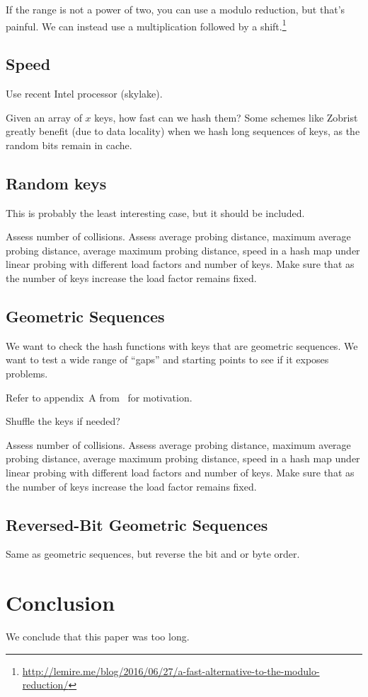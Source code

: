 \documentclass{article}
\begin{document}
If the range is not a power of two, you can use a modulo reduction, but that's painful.  We can instead use a multiplication followed by a shift.\footnote{\url{http://lemire.me/blog/2016/06/27/a-fast-alternative-to-the-modulo-reduction/}} 

\subsection{Speed}

Use recent Intel processor (skylake).

Given an array of $x$ keys, how fast can we hash them? Some schemes like Zobrist greatly benefit (due to data locality) when we hash long sequences of keys, as the random bits remain in cache.



\subsection{Random keys}

This is probably the least interesting case, but it should be included.

Assess number of collisions.
Assess average probing distance, 
maximum average probing distance, 
average maximum probing distance, 
speed in a hash map under linear probing with different load factors and number of keys. Make sure that as the number of keys increase the load factor remains fixed.

\subsection{Geometric Sequences}

We want to check the hash functions with keys that are geometric sequences. We want to test a wide range of ``gaps'' and starting points to see if it exposes problems. 

Refer to appendix~A from~\cite{Patrascu:2012:PST:2220357.2220361} for motivation.

Shuffle the keys if needed?

Assess number of collisions.
Assess average probing distance, 
maximum average probing distance, 
average maximum probing distance, 
speed in a hash map under linear probing with different load factors and number of keys.  Make sure that as the number of keys increase the load factor remains fixed.

\subsection{Reversed-Bit Geometric Sequences}

Same as geometric sequences, but reverse the bit and or byte order.

\section{Conclusion}

We conclude that this paper was too long.


 
\end{document}
